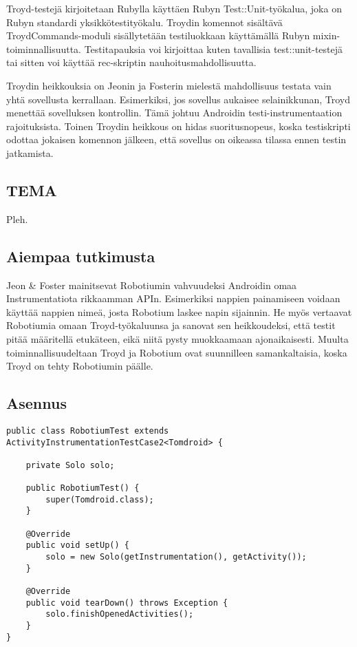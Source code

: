 Troyd-testejä kirjoitetaan Rubylla käyttäen Rubyn Test::Unit-työkalua, joka on Rubyn standardi yksikkötestityökalu. \cite{testunit} Troydin komennot sisältävä TroydCommands-moduli sisällytetään testiluokkaan käyttämällä Rubyn mixin-toiminnallisuutta. Testitapauksia voi kirjoittaa kuten tavallisia test::unit-testejä tai sitten voi käyttää rec-skriptin nauhoitusmahdollisuutta.

Troydin heikkouksia on Jeonin ja Fosterin mielestä mahdollisuus testata vain yhtä sovellusta kerrallaan. Esimerkiksi, jos sovellus aukaisee selainikkunan, Troyd menettää sovelluksen kontrollin. Tämä johtuu Androidin testi-instrumentaation rajoituksista. Toinen Troydin heikkous on hidas suoritusnopeus, koska testiskripti odottaa jokaisen komennon jälkeen, että sovellus on oikeassa tilassa ennen testin jatkamista. \cite{troyd}

\subsection{TEMA}

Pleh.

\subsection{Aiempaa tutkimusta}

Jeon \& Foster mainitsevat Robotiumin vahvuudeksi Androidin omaa Instrumentatiota rikkaamman APIn. Esimerkiksi nappien painamiseen voidaan käyttää nappien nimeä, josta Robotium laskee napin sijainnin. He myös vertaavat Robotiumia omaan Troyd-työkaluunsa ja sanovat sen heikkoudeksi, että testit pitää määritellä etukäteen, eikä niitä pysty muokkaamaan ajonaikaisesti. Muulta toiminnallisuudeltaan Troyd ja Robotium ovat suunnilleen samankaltaisia, koska Troyd on tehty Robotiumin päälle. \cite{troyd}

\subsection{Asennus}

\begin{lstlisting}[float,label=robotium_setup,caption=Robotium testirunko]
public class RobotiumTest extends ActivityInstrumentationTestCase2<Tomdroid> {

	private Solo solo;
	
	public RobotiumTest() {
		super(Tomdroid.class);
	}
	
	@Override
	public void setUp() {
		solo = new Solo(getInstrumentation(), getActivity());
	}
	
	@Override
	public void tearDown() throws Exception {
		solo.finishOpenedActivities();
	}
}
\end{lstlisting}


